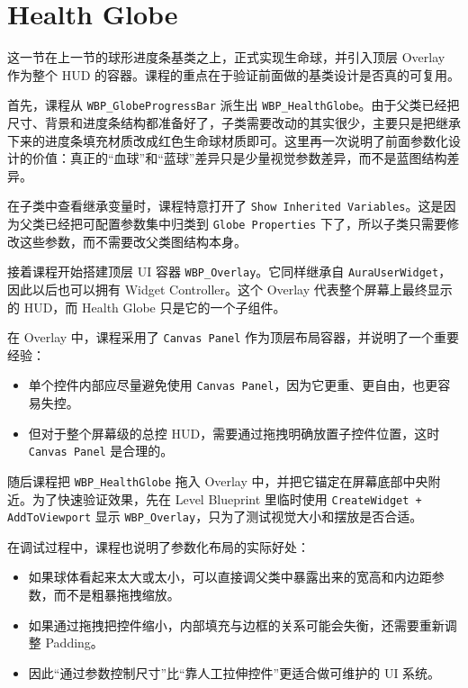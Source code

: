 \section{Health Globe}

这一节在上一节的球形进度条基类之上，正式实现生命球，并引入顶层 Overlay 作为整个 HUD 的容器。课程的重点在于验证前面做的基类设计是否真的可复用。

首先，课程从 \texttt{WBP\_GlobeProgressBar} 派生出 \texttt{WBP\_HealthGlobe}。由于父类已经把尺寸、背景和进度条结构都准备好了，子类需要改动的其实很少，主要只是把继承下来的进度条填充材质改成红色生命球材质即可。这里再一次说明了前面参数化设计的价值：真正的“血球”和“蓝球”差异只是少量视觉参数差异，而不是蓝图结构差异。

在子类中查看继承变量时，课程特意打开了 \texttt{Show Inherited Variables}。这是因为父类已经把可配置参数集中归类到 \texttt{Globe Properties} 下了，所以子类只需要修改这些参数，而不需要改父类图结构本身。

接着课程开始搭建顶层 UI 容器 \texttt{WBP\_Overlay}。它同样继承自 \texttt{AuraUserWidget}，因此以后也可以拥有 Widget Controller。这个 Overlay 代表整个屏幕上最终显示的 HUD，而 Health Globe 只是它的一个子组件。

在 Overlay 中，课程采用了 \texttt{Canvas Panel} 作为顶层布局容器，并说明了一个重要经验：
\begin{itemize}
	\item 单个控件内部应尽量避免使用 \texttt{Canvas Panel}，因为它更重、更自由，也更容易失控。
	\item 但对于整个屏幕级的总控 HUD，需要通过拖拽明确放置子控件位置，这时 \texttt{Canvas Panel} 是合理的。
\end{itemize}

随后课程把 \texttt{WBP\_HealthGlobe} 拖入 Overlay 中，并把它锚定在屏幕底部中央附近。为了快速验证效果，先在 Level Blueprint 里临时使用 \texttt{CreateWidget + AddToViewport} 显示 \texttt{WBP\_Overlay}，只为了测试视觉大小和摆放是否合适。

在调试过程中，课程也说明了参数化布局的实际好处：
\begin{itemize}
	\item 如果球体看起来太大或太小，可以直接调父类中暴露出来的宽高和内边距参数，而不是粗暴拖拽缩放。
	\item 如果通过拖拽把控件缩小，内部填充与边框的关系可能会失衡，还需要重新调整 Padding。
	\item 因此“通过参数控制尺寸”比“靠人工拉伸控件”更适合做可维护的 UI 系统。
\end{itemize}

